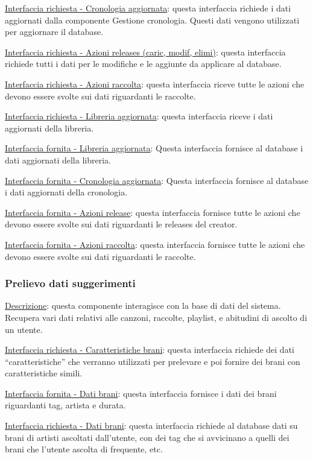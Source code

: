 \documentclass[a4paper,12pt]{article}
\begin{document}
\underline{Interfaccia richiesta - Cronologia aggiornata}: questa interfaccia richiede i dati aggiornati dalla componente Gestione cronologia. Questi dati vengono utilizzati per aggiornare il database.

\underline{Interfaccia richiesta - Azioni releases (caric, modif, elimi)}: questa interfaccia richiede tutti i dati per le modifiche e le aggiunte da applicare al database.

\underline{Interfaccia richiesta - Azioni raccolta}: questa interfaccia riceve tutte le azioni che devono essere svolte sui dati riguardanti le raccolte.

\underline{Interfaccia richiesta - Libreria aggiornata}: questa interfaccia riceve i dati aggiornati della libreria.

\underline{Interfaccia fornita - Libreria aggiornata}: Questa interfaccia fornisce al database i dati aggiornati della libreria.

\underline{Interfaccia fornita - Cronologia aggiornata}: Questa interfaccia fornisce al database i dati aggiornati della cronologia.

\underline{Interfaccia fornita - Azioni release}: questa interfaccia fornisce tutte le azioni che devono essere svolte sui dati riguardanti le releases del creator.

\underline{Interfaccia fornita - Azioni raccolta}: questa interfaccia fornisce tutte le azioni che devono essere svolte sui dati riguardanti le raccolte.

\subsubsection{Prelievo dati suggerimenti}

\underline{Descrizione}: questa componente interagisce con la base di dati del sistema. Recupera vari dati relativi alle canzoni, raccolte, playlist, e abitudini di ascolto di un utente.

\underline{Interfaccia richiesta - Caratteristiche brani}: questa interfaccia richiede dei dati “caratteristiche” che verranno utilizzati per prelevare e poi fornire dei brani con caratteristiche simili.

\underline{Interfaccia fornita - Dati brani}: questa interfaccia fornisce i dati dei brani riguardanti tag, artista e durata.

\underline{Interfaccia richiesta - Dati brani}: questa interfaccia richiede al database dati su brani di artisti ascoltati dall’utente, con dei tag che si avvicinano a quelli dei brani che l’utente ascolta di frequente, etc.
\end{document}
